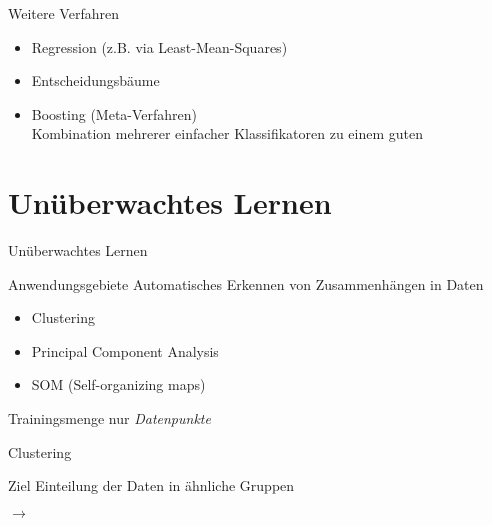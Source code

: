 \documentclass[xcolor={dvipsnames,svgnames},draft]{beamer}
\begin{document}
\begin{frame}{Weitere Verfahren}

  \begin{itemize}
  \item Regression (z.B. via Least-Mean-Squares)
  \item Entscheidungsbäume
  \item Boosting (Meta-Verfahren) \\
    Kombination mehrerer einfacher Klassifikatoren zu einem guten
  \end{itemize}

\end{frame}

\section{Unüberwachtes Lernen}

\begin{frame}{Unüberwachtes Lernen}
  \begin{exampleblock}{Anwendungsgebiete}
    Automatisches Erkennen von Zusammenhängen in Daten
    \begin{itemize}
    \item Clustering
    \item Principal Component Analysis
    \item SOM (Self-organizing maps)
    \end{itemize}
  \end{exampleblock}

  \begin{block}{Trainingsmenge}
    nur \textit{Datenpunkte}
  \end{block}
\end{frame}

\begin{frame}{Clustering}
  \begin{block}{Ziel}
    Einteilung der Daten in ähnliche Gruppen
  \end{block}

  
  \centering
  \begin{minipage}{0.4\linewidth}
  \end{minipage}
  \quad$\rightarrow$\quad
  \begin{minipage}{0.4\linewidth}
  \end{minipage}
\end{frame}
\end{document}
